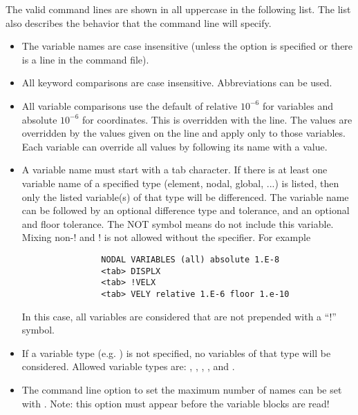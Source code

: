 The valid command lines are shown in all uppercase in the following
list. The list also describes the behavior that the command line will
specify.
\begin{itemize}
\item The variable names are case insensitive (unless the
	 option is specified or there is a
	 line in the command file).

\item All keyword comparisons are case insensitive. Abbreviations can be used.

\item All variable comparisons use the default of relative $10^{-6}$ for
	variables and absolute $10^{-6}$ for coordinates.  This is
	overridden with the  line.  The
	 values are overridden by the values
	given on the  line and apply only to those
	variables.  Each variable can override all values by following
	its name with a value.

\item A variable name must start with a tab character.  If there is at least
	one variable name of a specified type (element, nodal, global,
	...) is listed, then only the listed variable(s) of that type will be differenced.
	The variable name can be followed by an optional difference
	type and tolerance, and an optional  and floor
	tolerance. The NOT symbol \param{!} means do not include this
	variable.  Mixing non-! and ! is not allowed without the
	 specifier.  For example
\begin{verbatim}
                NODAL VARIABLES (all) absolute 1.E-8
                <tab> DISPLX
                <tab> !VELX
                <tab> VELY relative 1.E-6 floor 1.e-10
\end{verbatim}
           In this case, all variables are considered that are not prepended
           with a ``!'' symbol.

\item If a variable type (e.g. ) is not specified, no
	variables of that type will be considered.  Allowed variable
	types are: , ,
	, , and
	. 

\item The command line option to set the maximum number of \exo{} 
	names can be set with .  Note:  this option must
	appear before the variable blocks are read!


\end{itemize}
